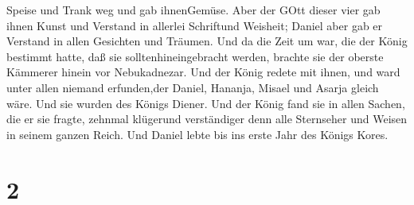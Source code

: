 Speise und Trank weg und gab ihnenGemüse.  Aber der GOtt
dieser vier gab ihnen Kunst und Verstand in allerlei Schriftund
Weisheit; Daniel aber gab er Verstand in allen Gesichten und Träumen.
 Und da die Zeit um war, die der König bestimmt hatte, daß
sie solltenhineingebracht werden, brachte sie der oberste Kämmerer
hinein vor Nebukadnezar.  Und der König redete mit ihnen,
und ward unter allen niemand erfunden,der Daniel, Hananja, Misael und
Asarja gleich wäre. Und sie wurden des Königs Diener.  Und
der König fand sie in allen Sachen, die er sie fragte, zehnmal klügerund
verständiger denn alle Sternseher und Weisen in seinem ganzen Reich.
 Und Daniel lebte bis ins erste Jahr des Königs Kores.

\hypertarget{section-1}{%
\section{2}\label{section-1}}

